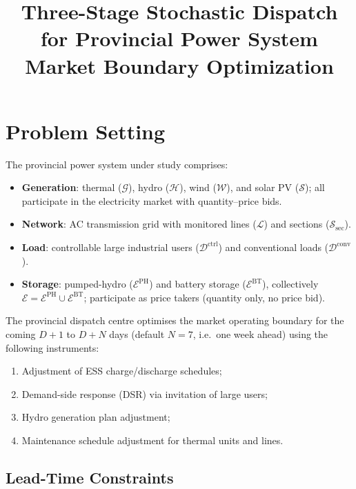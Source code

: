 \documentclass[11pt]{article}
\title{Three-Stage Stochastic Dispatch for Provincial Power System\\
  Market Boundary Optimization}
\author{}
\date{}
\begin{document}
\maketitle
\tableofcontents
\newpage

\section{Problem Setting}\label{sec:problem}

The provincial power system under study comprises:
\begin{itemize}
  \item \textbf{Generation}: thermal ($\mathcal{G}$), hydro
        ($\mathcal{H}$), wind ($\mathcal{W}$), and solar PV
        ($\mathcal{S}$); all participate in the electricity market with
        quantity--price bids.
  \item \textbf{Network}: AC transmission grid with monitored lines
        ($\mathcal{L}$) and sections ($\mathcal{S}_{\mathrm{sec}}$).
  \item \textbf{Load}: controllable large industrial users
        ($\mathcal{D}^{\mathrm{ctrl}}$) and conventional loads
        ($\mathcal{D}^{\mathrm{conv}}$).
  \item \textbf{Storage}: pumped-hydro ($\mathcal{E}^{\mathrm{PH}}$)
        and battery storage ($\mathcal{E}^{\mathrm{BT}}$), collectively
        $\mathcal{E} = \mathcal{E}^{\mathrm{PH}} \cup
        \mathcal{E}^{\mathrm{BT}}$; participate as price takers
        (quantity only, no price bid).
\end{itemize}

The provincial dispatch centre optimises the market operating boundary
for the coming $D{+}1$ to $D{+}N$ days (default $N=7$, i.e.\ one week
ahead) using the following instruments:
\begin{enumerate}
  \item Adjustment of ESS charge/discharge schedules;
  \item Demand-side response (DSR) via invitation of large users;
  \item Hydro generation plan adjustment;
  \item Maintenance schedule adjustment for thermal units and lines.
\end{enumerate}

\subsection{Lead-Time Constraints}
\end{document}
